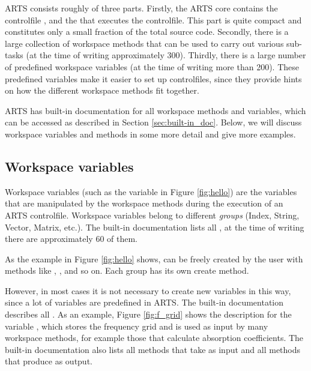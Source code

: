 ARTS consists roughly of three parts. Firstly, the ARTS core contains the
controlfile , and the  that executes the controlfile. This part is
quite compact and constitutes only a small fraction of the total source code.
Secondly, there is a large collection of workspace methods that can be used to
carry out various sub-tasks (at the time of writing approximately 300).
Thirdly, there is a large number of predefined workspace variables (at the time
of writing more than 200). These predefined variables make it easier to set up
controlfiles, since they provide hints on how the different workspace methods
fit together.

ARTS has built-in documentation for all workspace methods and
variables, which can be accessed as described in Section
\ref{sec:built-in_doc}.  Below, we will discuss workspace variables
and methods in some more detail and give more examples.

\subsection{Workspace variables}

Workspace variables (such as the variable  in Figure
\ref{fig:hello}) are the variables that are manipulated by the
workspace methods during the execution of an ARTS
controlfile. Workspace variables belong to different \emph{groups}
(Index, String, Vector, Matrix, etc.). The built-in documentation
lists all , at the time of writing there are
approximately 60 of them.

As the example in Figure \ref{fig:hello} shows,  can be freely created by the user with methods like
, , and so on. Each
group has its own create method.

However, in most cases it is not necessary to create new variables in
this way, since a lot of variables are predefined in ARTS. The
built-in documentation describes all . As an example, Figure \ref{fig:f_grid} shows the
description for the variable , which stores the
frequency grid and is used as input by many workspace methods, for
example those that calculate absorption coefficients. The built-in
documentation also lists all methods that take  as
input and all methods that produce  as output.

